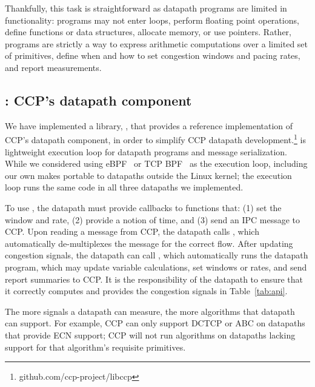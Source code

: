 Thankfully, this task is straightforward as datapath programs are limited in functionality: 
programs may not enter loops, perform floating point operations, define functions or data structures, allocate memory, or use pointers. Rather, programs are strictly a way to express arithmetic computations over a limited set of primitives, define when and how to set congestion windows and pacing rates, and report measurements.

\subsection{: CCP's datapath component}
\label{s:datapath:libccp}
We have implemented a library, , that provides a reference
implementation of CCP's datapath component, in order to simplify CCP datapath development.\footnote{github.com/ccp-project/libccp}
 is lightweight execution loop for
datapath programs and message serialization. 
While we considered using eBPF~\cite{ebpf} or TCP BPF~\cite{tcpbpf}
as the execution loop, including our own makes  portable to datapaths outside the Linux kernel; the execution loop runs the same code in all three datapaths we implemented.

To use , the datapath must provide callbacks to functions that: (1) set the window and rate, (2) provide a notion of time, and (3) send an IPC message to CCP. Upon reading a message from CCP, the datapath calls , which automatically de-multiplexes the message for the correct flow. After updating congestion signals, the datapath can call , which automatically runs the datapath program, which may update variable calculations, set windows or rates,
and send report summaries to CCP. It is the responsibility of the datapath to ensure that it correctly computes and provides the congestion signals in Table~\ref{tab:api}.

The more signals a datapath can measure, the more algorithms that datapath can support. For example, CCP can only support DCTCP \cite{DCTCP} or ABC \cite{abc} on datapaths that provide ECN support; CCP will not run algorithms on datapaths lacking support for that algorithm’s requisite primitives.


